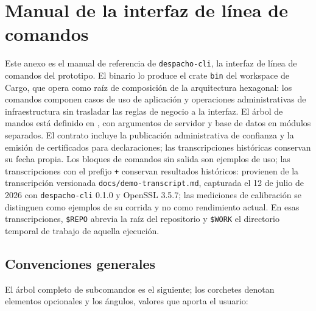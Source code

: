 \chapter{Manual de la interfaz de línea de comandos}\label{anexo:cli}

Este anexo es el manual de referencia de \texttt{despacho-cli}, la interfaz de línea de comandos del prototipo. El binario lo produce el crate \texttt{bin} del workspace de Cargo, que opera como raíz de composición de la arquitectura hexagonal: los comandos componen casos de uso de aplicación y operaciones administrativas de infraestructura sin trasladar las reglas de negocio a la interfaz. El árbol de mandos está definido en , con argumentos de servidor y base de datos en módulos separados. El contrato incluye la publicación administrativa de confianza y la emisión de certificados para declaraciones; las transcripciones históricas conservan su fecha propia. Los bloques de comandos sin salida son ejemplos de uso; las transcripciones con el prefijo \texttt{+} conservan resultados históricos: provienen de la transcripción versionada \texttt{docs/demo-transcript.md}, capturada el 12 de julio de 2026 con \texttt{despacho-cli} 0.1.0 y OpenSSL 3.5.7; las mediciones de calibración se distinguen como ejemplos de su corrida y no como rendimiento actual. En esas transcripciones, \texttt{\$REPO} abrevia la raíz del repositorio y \texttt{\$WORK} el directorio temporal de trabajo de aquella ejecución.

\section{Convenciones generales}\label{sec:cli-convenciones}

El árbol completo de subcomandos es el siguiente; los corchetes denotan elementos opcionales y los ángulos, valores que aporta el usuario:

